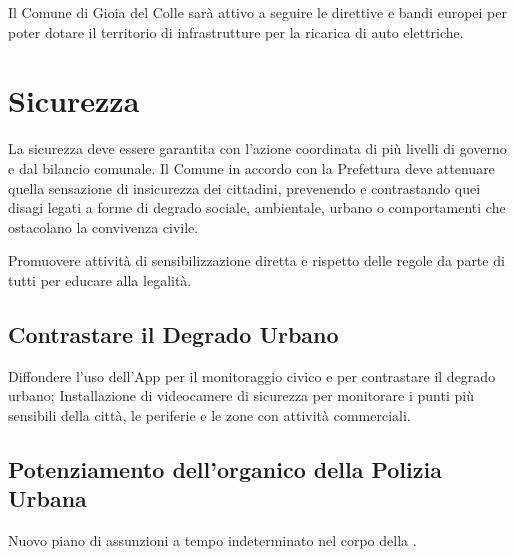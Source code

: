 \documentclass[a4paper,14pt,italian]{sphinxmanual}
\begin{document}
Il Comune di Gioia del Colle sarà attivo a seguire le direttive e bandi europei per poter dotare il territorio di infrastrutture per la ricarica di auto elettriche.


\chapter{Sicurezza}
\label{\detokenize{sicurezza:sicurezza}}\label{\detokenize{sicurezza::doc}}


La sicurezza deve essere garantita con l’azione coordinata di più livelli di governo e dal bilancio comunale.
Il Comune in accordo con la Prefettura deve attenuare quella sensazione di insicurezza dei cittadini, prevenendo e contrastando quei disagi legati a forme di degrado sociale, ambientale, urbano o comportamenti che ostacolano la convivenza civile.

Promuovere attività di sensibilizzazione diretta e rispetto delle regole da parte di tutti per educare alla legalità.


\section{Contrastare il Degrado Urbano}
\label{\detokenize{sicurezza:contrastare-il-degrado-urbano}}

Diffondere l’uso dell’App  per il monitoraggio civico e per contrastare il degrado urbano; Installazione di videocamere di sicurezza per monitorare i punti più sensibili della città, le periferie e le zone con attività commerciali.


\section{Potenziamento dell’organico della Polizia Urbana}
\label{\detokenize{sicurezza:potenziamento-dellorganico-della-polizia-urbana}}
Nuovo piano di assunzioni a tempo indeterminato nel corpo della .
\end{document}
